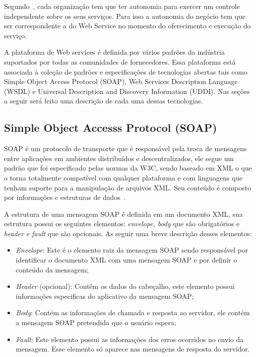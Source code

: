 Segundo~\cite{Bertino2010}, cada organização tem que ter autonomia para exercer um controle independente sobre os seus serviços. Para isso a autonomia do negócio tem que ser correspondente a do Web Service no momento do oferecimento e execução do serviço.

A plataforma de Web services é definida por vários padrões da indústria suportados por todas as comunidades de fornecedores. Essa plataforma está associada à coleção de padrões e especificações de tecnologias abertas tais como Simple Object Access Protocol (SOAP), Web Services Description Language (WSDL) e  Universal Description and Discovery Information (UDDI). Nas seções a seguir será feito uma descrição de cada uma dessas tecnologias.


\subsection{Simple Object Accesss Protocol (SOAP)}
SOAP é um protocolo de transporte que é responsável pela troca de mensagens entre aplicações em ambientes distribuídos e descentralizados, ele segue um padrão que foi especificado pelas normas da W3C, sendo baseado em XML o que o torna totalmente compatível com qualquer plataforma e com linguagens que tenham suporte para a manipulação de arquivos XML. Seu conteúdo é composto por informações e estruturas de dados~\cite{COYLE}.

A estrutura de uma mensagem SOAP é definida em um documento XML, sua estrutura possui os seguintes elementos:\emph{ envelope, body} que são obrigatórios e \emph{header e fault} que são opcionais. As seguir uma breve descrição desses elementos:

 \begin{itemize}
            \item \emph{Envelope}: Este é o elemento raiz da mensagem SOAP sendo responsável por identificar o documento XML com uma mensagem SOAP e por definir o conteúdo da mensagem;

            \item \emph{Header} (opcional): Contêm os dados do cabeçalho, este elemento possui informações especificas do aplicativo da mensagem SOAP;

            \item \emph{Body}: Contém as informações de chamada e resposta ao servidor, ele contém a mensagem SOAP pretendida que o usuário espera;

            \item \emph{Fault}: Este elemento possui as informações dos erros ocorridos no envio da mensagem. Esse elemento só aparece nas mensagens de resposta do servidor.

 \end{itemize}


